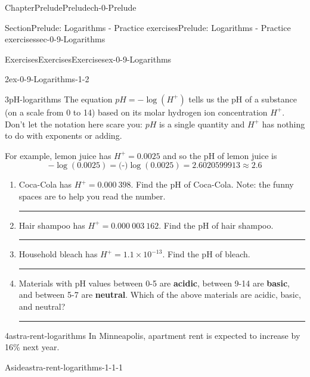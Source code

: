 \documentclass[twoside,11pt,]{book}
\newcommand{\terminology}[1]{\textbf{#1}}
\newlength{\fillinmaxwidth}
\newlength{\fillincontract}
\newlength{\charmaxwidth}\setlength{\charmaxwidth}{0.5em}
\newlength{\charminwidth}\setlength{\charminwidth}{0.1em}
\newlength{\fillinheight}
\newcommand{\fillintext}[1]{%
\setlength{\fillinmaxwidth}{#1\charmaxwidth}%
\setlength{\fillincontract}{#1\charminwidth}%
\setlength{\fillinheight}{\baselineskip}\addtolength{\fillinheight}{1.2pt}%
\strut\nobreak\leaders\vbox{\hrule width 0.3pt height 0.3pt \vskip -1.2pt}\hskip 1\fillinmaxwidth minus \fillincontract\nobreak\strut%
}
\newlength{\workspacestrutwidth}
\numberwithin{equation}{section}
\begin{document}
\begin{chapterptx}{Chapter}{Prelude}{}{Prelude}{}{}{ch-0-Prelude}
\begin{sectionptx}{Section}{Prelude: Logarithms - Practice exercises}{}{Prelude: Logarithms - Practice exercises}{}{}{sec-0-9-Logarithms}
\begin{exercises-subsection-numberless}{Exercises}{Exercises}{}{Exercises}{}{}{ex-0-9-Logarithms}
\begin{divisionexercise}{2}{}{}{ex-0-9-Logarithms-1-2}
%
\end{divisionexercise}%
\clearpage
\begin{divisionexercise}{3}{}{}{pH-logarithms}%
The equation \(pH = -\log(H^+)\) tells us the pH of a substance (on a scale from 0 to 14) based on its molar hydrogen ion concentration \(H^+\). Don't let the notation here scare you: \(pH\) is a single quantity and \(H^+\) has nothing to do with exponents or adding.%
 \par
For example, lemon juice has \(H^+= 0.0025\) and so the pH of lemon juice is%
\begin{equation*}
-\log(0.0025) = \text{(-)} \log(0.0025) = 2.6020599913 \approx 2.6
\end{equation*}
%
\begin{enumerate}[label=(\alph*),ref=\alph*]%
\item{}Coca-Cola has \(H^+= 0.000~398\). Find the pH of Coca-Cola. Note: the funny spaces are to help you read the number.%
\par\rule{\workspacestrutwidth}{0.4in}%
\item{}Hair shampoo has \(H^+= 0.000~003~162\). Find the pH of hair shampoo.%
\par\rule{\workspacestrutwidth}{0.4in}%
\item{}Household bleach has \(H^+=1.1 \times 10^{-13}\). Find the pH of bleach.%
\par\rule{\workspacestrutwidth}{0.4in}%
\item{}Materials with pH values between 0-5 are \terminology{acidic}, between 9-14 are \terminology{basic}, and between 5-7 are \terminology{neutral}. Which of the above materials are acidic, basic, and neutral?%
\par\rule{\workspacestrutwidth}{0.4in}%
\end{enumerate}%
\end{divisionexercise}%
 \begin{divisionexercise}{4}{}{}{astra-rent-logarithms}%
In Minneapolis, apartment rent is expected to increase by 16\% next year. \begin{aside}{Aside}{}{astra-rent-logarithms-1-1-1}%

\end{aside}
\end{divisionexercise}
\end{exercises-subsection-numberless}
\end{sectionptx}
\end{chapterptx}
\end{document}
